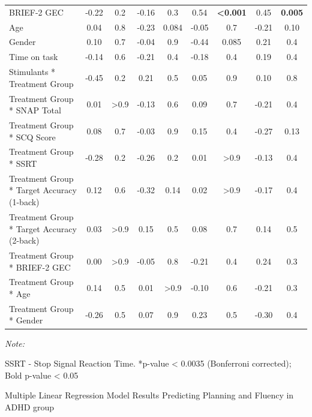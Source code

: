 \documentclass[
  letterpaper,
]{ut-thesis}
\begin{document}
\begin{landscape}
\begin{table}
{\begin{threeparttable}
{\begin{tabular}{lcccccccc}
BRIEF-2 GEC & -0.22 & 0.2 & -0.16 & 0.3 & 0.54 & \textbf{<0.001} & 0.45 & \textbf{0.005}\\
Age & 0.04 & 0.8 & -0.23 & 0.084 & -0.05 & 0.7 & -0.21 & 0.10\\
Gender & 0.10 & 0.7 & -0.04 & 0.9 & -0.44 & 0.085 & 0.21 & 0.4\\
Time on task & -0.14 & 0.6 & -0.21 & 0.4 & -0.18 & 0.4 & 0.19 & 0.4\\
Stimulants * Treatment Group & -0.45 & 0.2 & 0.21 & 0.5 & 0.05 & 0.9 & 0.10 & 0.8\\
Treatment Group * SNAP Total & 0.01 & >0.9 & -0.13 & 0.6 & 0.09 & 0.7 & -0.21 & 0.4\\
Treatment Group * SCQ Score & 0.08 & 0.7 & -0.03 & 0.9 & 0.15 & 0.4 & -0.27 & 0.13\\
Treatment Group * SSRT & -0.28 & 0.2 & -0.26 & 0.2 & 0.01 & >0.9 & -0.13 & 0.4\\
Treatment Group * Target Accuracy (1-back) & 0.12 & 0.6 & -0.32 & 0.14 & 0.02 & >0.9 & -0.17 & 0.4\\
Treatment Group * Target Accuracy (2-back) & 0.03 & >0.9 & 0.15 & 0.5 & 0.08 & 0.7 & 0.14 & 0.5\\
Treatment Group * BRIEF-2 GEC & 0.00 & >0.9 & -0.05 & 0.8 & -0.21 & 0.4 & 0.24 & 0.3\\
Treatment Group * Age & 0.14 & 0.5 & 0.01 & >0.9 & -0.10 & 0.6 & -0.21 & 0.3\\
Treatment Group * Gender & -0.26 & 0.5 & 0.07 & 0.9 & 0.23 & 0.5 & -0.30 & 0.4\\
\bottomrule
\end{tabular}}
\begin{tablenotes}[para]
\item \textit{Note: } 
\item SSRT - Stop Signal Reaction Time. *p-value < 0.0035 (Bonferroni corrected); Bold p-value < 0.05
\end{tablenotes}
\end{threeparttable}

}

\end{table}%

\begin{table}

\caption{\label{tbl-beta3}Multiple Linear Regression Model Results
Predicting Planning and Fluency in ADHD group}

\centering{

}
\end{table}
\end{landscape}
\end{document}
